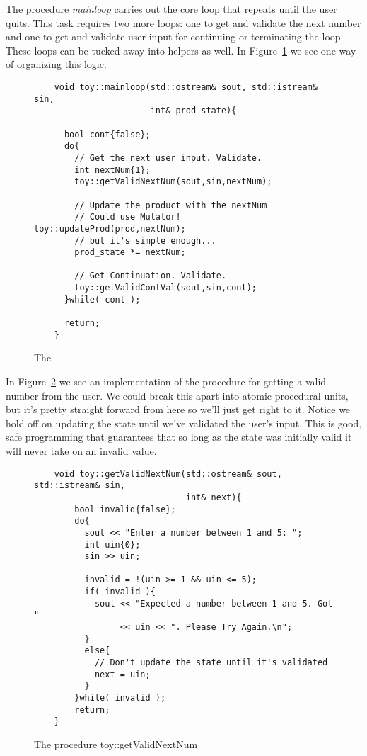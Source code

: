 \documentclass[]{tufte-handout}
\begin{document}
The procedure \textit{mainloop} carries out the core loop that repeats until the user quits. This task requires two more loops: one to get and validate the next number and one to get and validate user input for continuing or terminating the loop. These loops can be tucked away into helpers as well. In Figure~\ref{ex:mainloop} we see one way of organizing this logic.

\begin{figure}
  \begin{lstlisting}
    void toy::mainloop(std::ostream& sout, std::istream& sin,
                       int& prod_state){

      bool cont{false};
      do{
        // Get the next user input. Validate.
        int nextNum{1};
        toy::getValidNextNum(sout,sin,nextNum);

        // Update the product with the nextNum
        // Could use Mutator! toy::updateProd(prod,nextNum);
        // but it's simple enough...
        prod_state *= nextNum;

        // Get Continuation. Validate.
        toy::getValidContVal(sout,sin,cont);
      }while( cont );

      return;
    }
  \end{lstlisting}
\caption{The }
\label{ex:mainloop}
\end{figure}

In Figure~\ref{ex:validNum} we see an implementation of the procedure for getting a valid number from the user. We could break this apart into atomic procedural units, but it's pretty straight forward from here so we'll just get right to it. Notice we hold off on updating the state until we've validated the user's input. This is good, safe programming that guarantees that so long as the state was initially valid it will never take on an invalid value.

\begin{figure}
  \begin{lstlisting}
    void toy::getValidNextNum(std::ostream& sout, std::istream& sin,
                              int& next){
        bool invalid{false};
        do{
          sout << "Enter a number between 1 and 5: ";
          int uin{0};
          sin >> uin;

          invalid = !(uin >= 1 && uin <= 5);
          if( invalid ){
            sout << "Expected a number between 1 and 5. Got "
                 << uin << ". Please Try Again.\n";
          }
          else{
            // Don't update the state until it's validated
            next = uin;
          }
        }while( invalid );
        return;
    }
  \end{lstlisting}
  \caption{The procedure toy::getValidNextNum}
\label{ex:validNum}
\end{figure}
\end{document}
